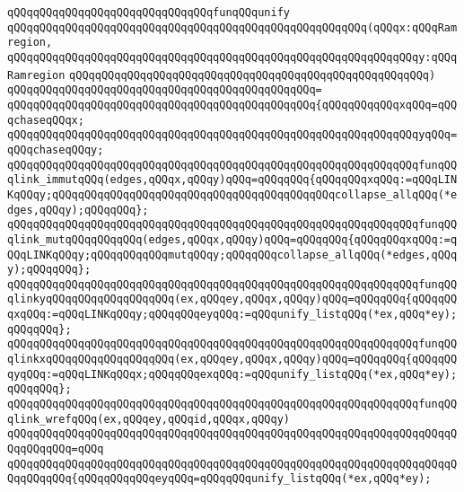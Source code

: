 \verb|qQQqqQQqqQQqqQQqqQQqqQQqqQQqqQQqfunqQQqunify|\newline
\verb|qQQqqQQqqQQqqQQqqQQqqQQqqQQqqQQqqQQqqQQqqQQqqQQqqQQqqQQq(qQQqx:qQQqRamregion,|\newline
\verb|qQQqqQQqqQQqqQQqqQQqqQQqqQQqqQQqqQQqqQQqqQQqqQQqqQQqqQQqqQQqqQQqy:qQQqRamregion|\newline
\verb|qQQqqQQqqQQqqQQqqQQqqQQqqQQqqQQqqQQqqQQqqQQqqQQqqQQqqQQq)|\newline
\verb|qQQqqQQqqQQqqQQqqQQqqQQqqQQqqQQqqQQqqQQqqQQqqQQq=|\newline
\verb|qQQqqQQqqQQqqQQqqQQqqQQqqQQqqQQqqQQqqQQqqQQqqQQq{qQQqqQQqqQQqxqQQq=qQQqchaseqQQqx;|\newline
\verb|qQQqqQQqqQQqqQQqqQQqqQQqqQQqqQQqqQQqqQQqqQQqqQQqqQQqqQQqqQQqqQQqyqQQq=qQQqchaseqQQqy;|\newline
\newline
\verb|qQQqqQQqqQQqqQQqqQQqqQQqqQQqqQQqqQQqqQQqqQQqqQQqqQQqqQQqqQQqqQQqfunqQQqlink_immutqQQq(edges,qQQqx,qQQqy)qQQq=qQQqqQQq{qQQqqQQqxqQQq:=qQQqLINKqQQqy;qQQqqQQqqQQqqQQqqQQqqQQqqQQqqQQqqQQqqQQqqQQqcollapse_allqQQq(*edges,qQQqy);qQQqqQQq};|\newline
\verb|qQQqqQQqqQQqqQQqqQQqqQQqqQQqqQQqqQQqqQQqqQQqqQQqqQQqqQQqqQQqqQQqfunqQQqlink_mutqQQqqQQqqQQq(edges,qQQqx,qQQqy)qQQq=qQQqqQQq{qQQqqQQqxqQQq:=qQQqLINKqQQqy;qQQqqQQqqQQqmutqQQqy;qQQqqQQqcollapse_allqQQq(*edges,qQQqy);qQQqqQQq};|\newline
\newline
\verb|qQQqqQQqqQQqqQQqqQQqqQQqqQQqqQQqqQQqqQQqqQQqqQQqqQQqqQQqqQQqqQQqfunqQQqlinkyqQQqqQQqqQQqqQQqqQQq(ex,qQQqey,qQQqx,qQQqy)qQQq=qQQqqQQq{qQQqqQQqxqQQq:=qQQqLINKqQQqy;qQQqqQQqeyqQQq:=qQQqunify_listqQQq(*ex,qQQq*ey);qQQqqQQq};|\newline
\verb|qQQqqQQqqQQqqQQqqQQqqQQqqQQqqQQqqQQqqQQqqQQqqQQqqQQqqQQqqQQqqQQqfunqQQqlinkxqQQqqQQqqQQqqQQqqQQq(ex,qQQqey,qQQqx,qQQqy)qQQq=qQQqqQQq{qQQqqQQqyqQQq:=qQQqLINKqQQqx;qQQqqQQqexqQQq:=qQQqunify_listqQQq(*ex,qQQq*ey);qQQqqQQq};|\newline
\newline
\verb|qQQqqQQqqQQqqQQqqQQqqQQqqQQqqQQqqQQqqQQqqQQqqQQqqQQqqQQqqQQqqQQqfunqQQqlink_wrefqQQq(ex,qQQqey,qQQqid,qQQqx,qQQqy)|\newline
\verb|qQQqqQQqqQQqqQQqqQQqqQQqqQQqqQQqqQQqqQQqqQQqqQQqqQQqqQQqqQQqqQQqqQQqqQQqqQQqqQQq=qQQq|\newline
\verb|qQQqqQQqqQQqqQQqqQQqqQQqqQQqqQQqqQQqqQQqqQQqqQQqqQQqqQQqqQQqqQQqqQQqqQQqqQQqqQQq{qQQqqQQqqQQqeyqQQq=qQQqqQQqunify_listqQQq(*ex,qQQq*ey);|\newline
